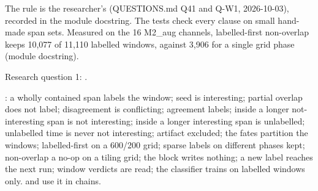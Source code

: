 The rule is the researcher's (QUESTIONS.md Q41 and Q-W1, 2026-10-03), recorded in the module
docstring. The tests check every clause on small hand-made span sets. Measured on the 16 M2\_aug
channels, labelled-first non-overlap keeps 10,077 of 11,110 labelled windows, against 3,906 for a
single grid phase (module docstring).

Research question 1: .

: a wholly contained span labels the window; seed is
interesting; partial overlap does not label; disagreement is conflicting; agreement labels;
inside a longer not-interesting span is not interesting; inside a longer interesting span is
unlabelled; unlabelled time is never not interesting; artifact excluded; the fates partition the
windows; labelled-first on a 600/200 grid; sparse labels on different phases kept; non-overlap a
no-op on a tiling grid; the block writes nothing; a new label reaches the next run; window verdicts
are read; the classifier trains on labelled windows only.
 and 
use it in chains.
